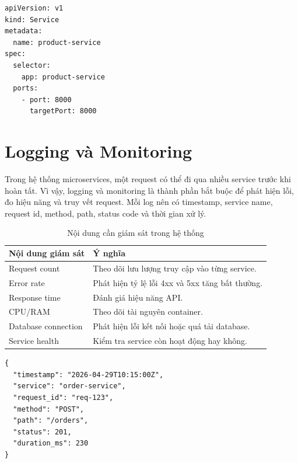 \documentclass[../main.tex]{subfiles}
\begin{document}
\begin{lstlisting}[caption={Kubernetes Service mẫu}, label={lst:chapter4-k8s-service}]
apiVersion: v1
kind: Service
metadata:
  name: product-service
spec:
  selector:
    app: product-service
  ports:
    - port: 8000
      targetPort: 8000
\end{lstlisting}

\section{Logging và Monitoring}
\label{section:4.9}

Trong hệ thống microservices, một request có thể đi qua nhiều service trước khi hoàn tất. Vì vậy, logging và monitoring là thành phần bắt buộc để phát hiện lỗi, đo hiệu năng và truy vết request. Mỗi log nên có timestamp, service name, request id, method, path, status code và thời gian xử lý.

\begin{table}[H]
    \centering
    \caption{Nội dung cần giám sát trong hệ thống}
    \label{tab:chapter4-monitoring-metrics}
    \begin{tabular}{|p{}|p{}|}
        \hline
        \rowcolor{primary!35}
        \textbf{Nội dung giám sát} & \textbf{Ý nghĩa} \\
        \hline
        Request count & Theo dõi lưu lượng truy cập vào từng service. \\
        \hline
        Error rate & Phát hiện tỷ lệ lỗi 4xx và 5xx tăng bất thường. \\
        \hline
        Response time & Đánh giá hiệu năng API. \\
        \hline
        CPU/RAM & Theo dõi tài nguyên container. \\
        \hline
        Database connection & Phát hiện lỗi kết nối hoặc quá tải database. \\
        \hline
        Service health & Kiểm tra service còn hoạt động hay không. \\
        \hline
    \end{tabular}
\end{table}

\begin{lstlisting}[caption={Log request mẫu}, label={lst:chapter4-log-format}]
{
  "timestamp": "2026-04-29T10:15:00Z",
  "service": "order-service",
  "request_id": "req-123",
  "method": "POST",
  "path": "/orders",
  "status": 201,
  "duration_ms": 230
}
\end{lstlisting}
\end{document}
